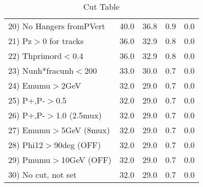 \begin{table}[h!]
\begin{tabular}{||l||r|r|r|r||}
 20) No Hangers fromPVert &        40.0 &        36.8 &         0.9 &         0.0 \\
 21) Pz$>$0 for tracks    &        36.0 &        32.9 &         0.8 &         0.0 \\
 22) Thprimord$<$0.4      &        36.0 &        32.9 &         0.8 &         0.0 \\
 23) Nunh*fracunh$<$200   &        33.0 &        30.0 &         0.7 &         0.0 \\
 24) Emumu$>$2GeV         &        32.0 &        29.0 &         0.7 &         0.0 \\
 25) P+,P-$>$0.5          &        32.0 &        29.0 &         0.7 &         0.0 \\
 26) P+,P-$>$1.0 (2.5mux) &        32.0 &        29.0 &         0.7 &         0.0 \\
 27) Emumu$>$5GeV  (8mux) &        32.0 &        29.0 &         0.7 &         0.0 \\
 28) Phi12$>$90deg  (OFF) &        32.0 &        29.0 &         0.7 &         0.0 \\
 29) Pmumu$>$10GeV  (OFF) &        32.0 &        29.0 &         0.7 &         0.0 \\
 30) No cut, not set      &        32.0 &        29.0 &         0.7 &         0.0 \\
 \hline
 \hline
 \end{tabular}
 \caption{Cut Table \cohpip }
 \label{tab-cut_copip}
 \end{table}
